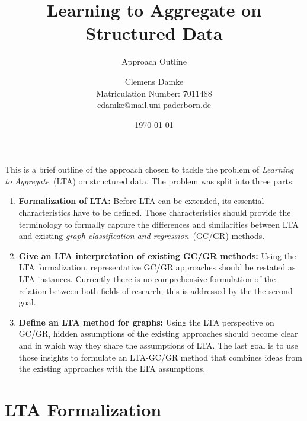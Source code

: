 \documentclass[12pt]{scrartcl}
\makeatletter
\newcommand{\thesisTitle}{Learning to Aggregate on Structured Data}
\newcommand{\thesisSubject}{Approach Outline}
\newcommand{\thesisName}{Clemens Damke}
\newcommand{\thesisMail}{cdamke@mail.uni-paderborn.de}
\newcommand{\thesisMatNr}{7011488}
\makeatother
\begin{document}
\title{\thesisTitle}
\subtitle{\thesisSubject}
\author{{\thesisName}\\\small{Matriculation Number: \thesisMatNr}\\\small{\href{mailto:\thesisMail}{\thesisMail}}}
\date{\today}
\maketitle

This is a brief outline of the approach chosen to tackle the problem of \textit{Learning to Aggregate}~(LTA) on structured data.
The problem was split into three parts:
\begin{enumerate}[label=\textbf{\arabic*.}]
	\item \textbf{Formalization of LTA:}
		Before LTA can be extended, its essential characteristics have to be defined.
		Those characteristics should provide the terminology to formally capture the differences and similarities between LTA and existing \textit{graph classification and regression}~(GC/GR) methods.
	\item \textbf{Give an LTA interpretation of existing GC/GR methods:}
		Using the LTA formalization, representative GC/GR approaches should be restated as LTA instances.
		Currently there is no comprehensive formulation of the relation between both fields of research;
		this is addressed by the the second goal.
	\item \textbf{Define an LTA method for graphs:}
		Using the LTA perspective on GC/GR, hidden assumptions of the existing approaches should become clear and in which way they share the assumptions of LTA.\@
		The last goal is to use those insights to formulate an LTA-GC/GR method that combines ideas from the existing approaches with the LTA assumptions.
\end{enumerate}

\section{LTA Formalization}%
\label{sec:lta}
\end{document}
